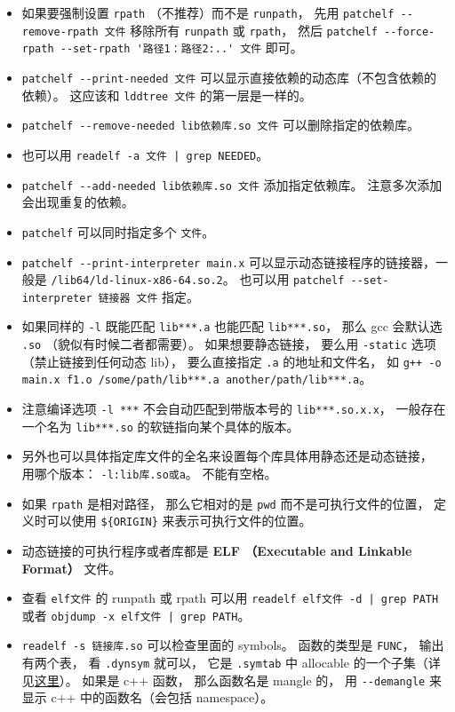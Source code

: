 \begin{itemize}
\item 如果要强制设置 \verb`rpath` （不推荐）而不是 \verb`runpath`， 先用 \verb`patchelf --remove-rpath 文件` 移除所有 \verb`runpath` 或 \verb`rpath`， 然后 \verb`patchelf --force-rpath --set-rpath '路径1：路径2:..' 文件` 即可。
\item \verb`patchelf --print-needed 文件` 可以显示直接依赖的动态库（不包含依赖的依赖）。 这应该和 \verb`lddtree 文件` 的第一层是一样的。
\item \verb`patchelf --remove-needed lib依赖库.so 文件` 可以删除指定的依赖库。
\item 也可以用 \verb`readelf -a 文件 | grep NEEDED`。
\item \verb`patchelf --add-needed lib依赖库.so 文件` 添加指定依赖库。 注意多次添加会出现重复的依赖。
\item \verb`patchelf` 可以同时指定多个 \verb`文件`。
\item \verb`patchelf --print-interpreter main.x` 可以显示动态链接程序的链接器，一般是 \verb`/lib64/ld-linux-x86-64.so.2`。 也可以用 \verb`patchelf --set-interpreter 链接器 文件` 指定。 
\item 如果同样的 \verb`-l` 既能匹配 \verb`lib***.a` 也能匹配 \verb`lib***.so`， 那么 gcc 会默认选 \verb`.so` （貌似有时候二者都需要）。 如果想要静态链接， 要么用 \verb`-static` 选项（禁止链接到任何动态 lib）， 要么直接指定 \verb`.a` 的地址和文件名， 如 \verb`g++ -o main.x f1.o /some/path/lib***.a another/path/lib***.a`。
\item 注意编译选项 \verb`-l ***` 不会自动匹配到带版本号的 \verb`lib***.so.x.x`， 一般存在一个名为 \verb`lib***.so` 的软链指向某个具体的版本。
\item 另外也可以具体指定库文件的全名来设置每个库具体用静态还是动态链接， 用哪个版本： \verb`-l:lib库.so或a`。 不能有空格。
\item 如果 \verb`rpath` 是相对路径， 那么它相对的是 \verb`pwd` 而不是可执行文件的位置， 定义时可以使用 \verb`${ORIGIN}` 来表示可执行文件的位置。
\item 动态链接的可执行程序或者库都是 \textbf{ELF （Executable and Linkable Format）} 文件。
\item 查看 \verb`elf文件` 的 runpath 或 rpath 可以用 \verb`readelf elf文件 -d | grep PATH` 或者 \verb`objdump -x elf文件 | grep PATH`。
\item \verb`readelf -s 链接库.so` 可以检查里面的 symbols。 函数的类型是 \verb`FUNC`， 输出有两个表， 看 \verb`.dynsym` 就可以， 它是 \verb`.symtab` 中 allocable 的一个子集（详见\href{https://blogs.oracle.com/solaris/post/inside-elf-symbol-tables}{这里}）。 如果是 c++ 函数， 那么函数名是 mangle 的， 用 \verb`--demangle` 来显示 c++ 中的函数名（会包括 namespace）。

\end{itemize}
